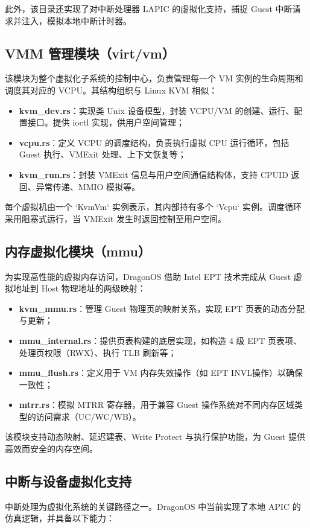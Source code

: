 \documentclass[analyze]{mancls}
\begin{document}
此外，该目录还实现了对中断处理器 LAPIC 的虚拟化支持，捕捉 Guest 中断请求并注入，模拟本地中断计时器。

\subsection{VMM 管理模块（virt/vm）}
该模块为整个虚拟化子系统的控制中心，负责管理每一个 VM 实例的生命周期和调度其对应的 VCPU。其结构组织与 Linux KVM 相似：

\begin{itemize}
    \item \textbf{kvm\_dev.rs}：实现类 Unix 设备模型，封装 VCPU/VM 的创建、运行、配置接口。提供 ioctl 实现，供用户空间管理；
    \item \textbf{vcpu.rs}：定义 VCPU 的调度结构，负责执行虚拟 CPU 运行循环，包括 Guest 执行、VMExit 处理、上下文恢复等；
    \item \textbf{kvm\_run.rs}：封装 VMExit 信息与用户空间通信结构体，支持 CPUID 返回、异常传递、MMIO 模拟等。
\end{itemize}

每个虚拟机由一个 `KvmVm` 实例表示，其内部持有多个 `Vcpu` 实例。调度循环采用阻塞式运行，当 VMExit 发生时返回控制至用户空间。

\subsection{内存虚拟化模块（mmu）}
为实现高性能的虚拟内存访问，DragonOS 借助 Intel EPT 技术完成从 Guest 虚拟地址到 Host 物理地址的两级映射：

\begin{itemize}
    \item \textbf{kvm\_mmu.rs}：管理 Guest 物理页的映射关系，实现 EPT 页表的动态分配与更新；
    \item \textbf{mmu\_internal.rs}：提供页表构建的底层实现，如构造 4 级 EPT 页表项、处理页权限（RWX）、执行 TLB 刷新等；
    \item \textbf{mmu\_flush.rs}：定义用于 VM 内存失效操作（如 EPT INVL操作）以确保一致性；
    \item \textbf{mtrr.rs}：模拟 MTRR 寄存器，用于兼容 Guest 操作系统对不同内存区域类型的访问需求（UC/WC/WB）。
\end{itemize}

该模块支持动态映射、延迟建表、Write Protect 与执行保护功能，为 Guest 提供高效而安全的内存空间。

\subsection{中断与设备虚拟化支持}
中断处理为虚拟化系统的关键路径之一。DragonOS 中当前实现了本地 APIC 的仿真逻辑，并具备以下能力：
\end{document}
